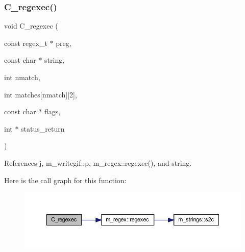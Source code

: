 \subsubsection{\texorpdfstring{C\+\_\+regexec()}{C\_regexec()}}
{\footnotesize\ttfamily void C\+\_\+regexec (\begin{DoxyParamCaption}\item[{const regex\+\_\+t $\ast$}]{preg,  }\item[{const char $\ast$}]{string,  }\item[{int}]{nmatch,  }\item[{int}]{matches\mbox{[}nmatch\mbox{]}\mbox{[}2\mbox{]},  }\item[{const char $\ast$}]{flags,  }\item[{int $\ast$}]{status\+\_\+return }\end{DoxyParamCaption})}



References j, m\+\_\+writegif\+::p, m\+\_\+regex\+::regexec(), and string.

Here is the call graph for this function\+:
\nopagebreak
\begin{figure}[H]
\begin{center}
\leavevmode
\includegraphics[width=350pt]{C-M__regex_8c_ad4d383ae55d866605fb7ff11e8cf99d8_cgraph}
\end{center}
\end{figure}

